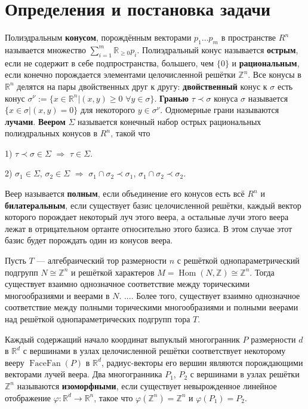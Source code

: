 \documentclass[12pt,notitlepage]{article}
\DeclareMathOperator{\Hom}{Hom}
\DeclareMathOperator{\FF}{FaceFan}
\begin{document}
	\section{Определения и постановка задачи}
	
	Полиэдральным \textbf{конусом}, порождённым векторами $p_1 ... p_m$ в пространстве $R^n$ называется множество $\sum_{i=1}^m \mathbb{R}_{\geq 0} p_i$. Полиэдральный конус называется \textbf{острым}, если не содержит в себе подпространства, большего, чем $\{0\}$ и \textbf{рациональным}, если конечно порождается элементами целочисленной решётки $\mathbb{Z}^n$. Все конусы в $\mathbb{R}^n$ делятся на пары двойственных друг к другу: \textbf{двойственный} конус к $\sigma$ есть конус $\sigma^\nu := \{x \in \mathbb{R}^n | (x, y) \geq 0$ $\forall y \in \sigma\}$. \textbf{Гранью} $\tau \prec \sigma$ конуса $\sigma$ называется $\{x \in \sigma |(x, y) = 0\}$ для некоторого $y \in \sigma^\nu$. Одномерные грани называются \textbf{лучами}. \textbf{Веером} $\Sigma$ называется конечный набор острых рациональных полиэдральных конусов в $R^n$, такой что
	
	1) $\tau \prec \sigma \in \Sigma$ $\Rightarrow$ $\tau \in \Sigma$.
	
	2) $\sigma_1 \in \Sigma$, $\sigma_2 \in \Sigma$ $\Rightarrow$ $\sigma_1 \cap \sigma_2 \prec \sigma_1$, $\sigma_1 \cap \sigma_2 \prec \sigma_2$.
	
	Веер называется \textbf{полным}, если объединение его конусов есть всё $R^n$ и \textbf{билатеральным}, если существует базис целочисленной решётки, каждый вектор которого порождает некоторый луч этого веера, а остальные лучи этого веера лежат в отрицательном ортанте относительно этого базиса. В этом случае этот базис будет порождать один из конусов веера.
	
	Пусть $T$ --- алгебраический тор размерности $n$ с решёткой однопараметрический подгрупп $N \cong \mathbb{Z}^n$ и решёткой характеров $M = \Hom(N, \mathbb{Z}) \cong \mathbb{Z}^n$. Тогда существует взаимно однозначное соответствие между торическими многообразиями и веерами в $N$. .... Более того, существует взаимно однозначное соответствие между полными торическими многообразиями и полными веерами над решёткой однопараметрических подгрупп тора $T$.
	
	Каждый содержащий начало координат выпуклый многогранник $P$ размерности $d$ в $\mathbb{R}^d$ с вершинами в узлах целочисленной решётки соответствует некоторому вееру $\FF(P)$ в $\mathbb{R}^d$, радиус-векторы его вершин являются порождающими векторами лучей веера.
	Два многогранника $P_1$, $P_2$ с вершинами в узлах решётки $\mathbb{Z}^n$ называются \textbf{изоморфными}, если существует невырожденное линейное отображение $\varphi:\mathbb{R}^d \rightarrow \mathbb{R}^n$, такое что $\varphi(\mathbb{Z}^n) = \mathbb{Z}^n$ и $\varphi(P_1) = P_2$.
	
\end{document}
